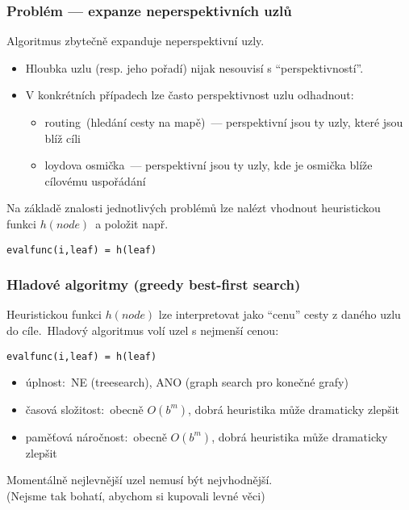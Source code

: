 \documentclass[red,handout,professionalfont]{beamer}
\theoremstyle{definition}
\newcommand{\0}{\mbox{${\bf 0}$}}
\begin{document}
\begin{frame}\frametitle{Problém --- expanze neperspektivních uzlů}
\begin{block}{}
\begin{center}
 Algoritmus zbytečně expanduje neperspektivní uzly. 
\end{center}
\end{block}\pause
\begin{itemize}
 \item Hloubka uzlu (resp. jeho pořadí) nijak nesouvisí s ``perspektivností''.\pause
 \item V konkrétních případech lze často perspektivnost uzlu odhadnout:\pause
 \begin{itemize}
   \item routing\pause\ (hledání cesty na mapě)\pause\ --- perspektivní jsou ty uzly, které jsou blíž cíli\pause
   \item loydova osmička\pause\ --- perspektivní jsou ty uzly, kde je osmička blíže cílovému uspořádání\pause
 \end{itemize}
\end{itemize}
Na základě znalosti jednotlivých problémů lze nalézt vhodnout \alert{heuristickou funkci} $h(node)$\pause\ a položit např.
\begin{center}
 {\tt evalfunc(i,leaf) = h(leaf)}
\end{center}
\end{frame}

\begin{frame}\frametitle{Hladové algoritmy (greedy best-first search)}
Heuristickou funkci $h(node)$ lze interpretovat jako ``cenu'' cesty z daného uzlu do cíle.\pause\ Hladový algoritmus volí uzel s nejmenší cenou:\pause
\begin{center}
 {\tt evalfunc(i,leaf) = h(leaf)}
\end{center}\pause
\begin{itemize}
 \item úplnost:\pause\ NE (treesearch)\pause, ANO (graph search pro konečné grafy)\pause
 \item časová složitost:\pause\ obecně $O(b^m)$\pause, dobrá heuristika může dramaticky zlepšit\pause
 \item paměťová náročnost:\pause\  obecně $O(b^m)$\pause, dobrá heuristika může dramaticky zlepšit\pause
\end{itemize}
\begin{block}{}
\begin{center}
  Momentálně nejlevnější uzel nemusí být nejvhodnější.\pause\\ (Nejsme tak bohatí, abychom si kupovali levné věci)
\end{center}
\end{block}
\end{frame}
\end{document}
